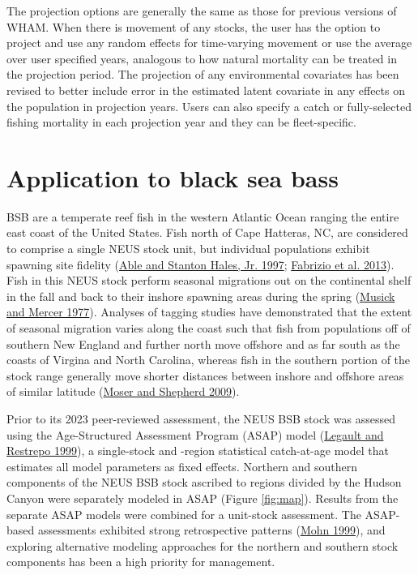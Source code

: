 \documentclass[
]{article}
\begin{document}
The projection options are generally the same as those for previous versions of WHAM. When there is movement of any stocks, the user has the option to project and use any random effects for time-varying movement or use the average over user specified years, analogous to how natural mortality can be treated in the projection period. The projection of any environmental covariates has been revised to better include error in the estimated latent covariate in any effects on the population in projection years. Users can also specify a catch or fully-selected fishing mortality in each projection year and they can be fleet-specific.

\hypertarget{application-to-black-sea-bass}{%
\section*{Application to black sea bass}\label{application-to-black-sea-bass}}

BSB are a temperate reef fish in the western Atlantic Ocean ranging the entire east coast of the United States. Fish north of Cape Hatteras, NC, are considered to comprise a single NEUS stock unit, but individual populations exhibit spawning site fidelity (\protect\hyperlink{ref-ablehales97}{Able and Stanton Hales, Jr. 1997}; \protect\hyperlink{ref-fabrizioetal13}{Fabrizio et al. 2013}). Fish in this NEUS stock perform seasonal migrations out on the continental shelf in the fall and back to their inshore spawning areas during the spring (\protect\hyperlink{ref-musickmercer77}{Musick and Mercer 1977}). Analyses of tagging studies have demonstrated that the extent of seasonal migration varies along the coast such that fish from populations off of southern New England and further north move offshore and as far south as the coasts of Virgina and North Carolina, whereas fish in the southern portion of the stock range generally move shorter distances between inshore and offshore areas of similar latitude (\protect\hyperlink{ref-mosershepherd09}{Moser and Shepherd 2009}).

Prior to its 2023 peer-reviewed assessment, the NEUS BSB stock was assessed using the Age-Structured Assessment Program (ASAP) model (\protect\hyperlink{ref-legaultrestrepo99}{Legault and Restrepo 1999}), a single-stock and -region statistical catch-at-age model that estimates all model parameters as fixed effects. Northern and southern components of the NEUS BSB stock ascribed to regions divided by the Hudson Canyon were separately modeled in ASAP (Figure \ref{fig:map}). Results from the separate ASAP models were combined for a unit-stock assessment. The ASAP-based assessments exhibited strong retrospective patterns (\protect\hyperlink{ref-mohn99}{Mohn 1999}), and exploring alternative modeling approaches for the northern and southern stock components has been a high priority for management.
\end{document}
